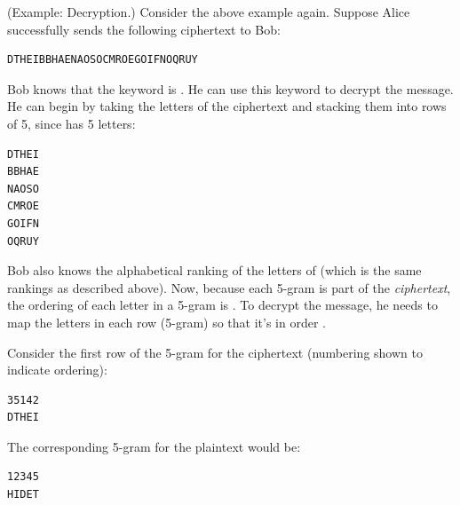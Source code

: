 \documentclass[letterpaper]{article}
\begin{document}
\begin{mdframed}
    (Example: Decryption.) Consider the above example again. Suppose Alice successfully sends the following ciphertext to Bob:
    \begin{mdframed}
        \begin{verbatim}
DTHEIBBHAENAOSOCMROEGOIFNOQRUY\end{verbatim}
    \end{mdframed}
    Bob knows that the keyword is . He can use this keyword to decrypt the message. He can begin by taking the letters of the ciphertext and stacking them into rows of 5, since  has 5 letters:
    \begin{mdframed}
        \begin{verbatim}
DTHEI
BBHAE
NAOSO
CMROE
GOIFN
OQRUY\end{verbatim}
    \end{mdframed}
    Bob also knows the alphabetical ranking of the letters of  (which is the same rankings as described above). Now, because each 5-gram is part of the \emph{ciphertext}, the ordering of each letter in a 5-gram is . To decrypt the message, he needs to map the letters in each row (5-gram) so that it's in order . 
    
    \bigskip
    
    Consider the first row of the 5-gram for the ciphertext (numbering shown to indicate ordering):
    \begin{mdframed}
        \begin{verbatim}
35142
DTHEI\end{verbatim}
    \end{mdframed}
    The corresponding 5-gram for the plaintext would be: 
    \begin{mdframed}
        \begin{verbatim}
12345
HIDET\end{verbatim}
    \end{mdframed}


\end{mdframed}
\end{document}
